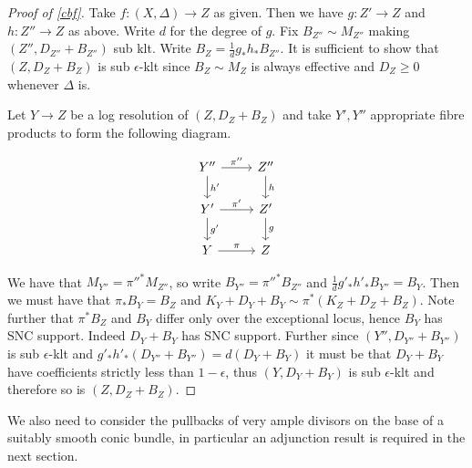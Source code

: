 \documentclass[a4paper,12pt]{book}
\begin{document}
\begin{proof}[Proof of \autoref{cbf}]
	Take $f\colon (X,\Delta) \to Z$ as given. Then we have $g\colon Z' \to Z$ and $h\colon Z''\to Z$ as above. Write $d$ for the degree of $g$.
	Fix $B_{Z''}\sim M_{Z''}$ making $(Z'',D_{Z''}+B_{Z''})$ sub klt. Write $B_{Z}=\frac{1}{d}g_{*}h_{*}B_{Z''}$. It is sufficient to show that $(Z,D_{Z}+B_{Z})$ is sub $\epsilon$-klt since $B_{Z} \sim M_{Z}$ is always effective and $D_{Z} \geq 0$ whenever $\Delta$ is.
	
	Let $Y \to Z$ be a log resolution of $(Z,D_{Z}+B_{Z})$ and take $Y',Y''$ appropriate fibre products to form the following diagram.
	
	\[\begin{tikzcd}
	Y'' \arrow[r, "\pi''"] \arrow[d, "h'"] & Z'' \arrow[d, "h"] \\
	Y' \arrow[r, "\pi'"] \arrow[d, "g'"]   & Z' \arrow[d, "g"]  \\
	Y \arrow[r, "\pi"]                     & Z                 
	\end{tikzcd}\]
	
	
	We have that $M_{Y''}=\pi''^{*}M_{Z''}$, so write $B_{Y''}=\pi''^{*}B_{Z''}$ and $\frac{1}{d}g'_{*}h'_{*}B_{Y''}=B_{Y}$. Then we must have that $\pi_{*}B_{Y}=B_{Z}$ and $K_{Y}+D_{Y}+B_{Y}\sim \pi^{*}(K_{Z}+D_{Z}+B_{Z})$. Note further that $\pi^{*}B_{Z}$ and $B_{Y}$ differ only over the exceptional locus, hence $B_{Y}$ has SNC support. Indeed $D_{Y}+B_{Y}$ has SNC support. Further since $(Y'',D_{Y''}+B_{Y''})$ is sub $\epsilon$-klt and $g'_{*}h'_{*}(D_{Y''}+B_{Y''})=d(D_{Y}+B_{Y})$ it must be that $D_{Y}+B_{Y}$ have coefficients strictly less than $1-\epsilon$, thus $(Y,D_{Y}+B_{Y})$ is sub $\epsilon$-klt and therefore so is $(Z,D_{Z}+B_{Z})$.
\end{proof}
We also need to consider the pullbacks of very ample divisors on the base of a suitably smooth conic bundle, in particular an adjunction result is required in the next section.
\end{document}
